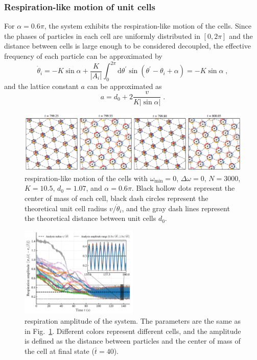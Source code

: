 \documentclass{article}
\begin{document}
\newpage
\subsubsection{Respiration-like motion of unit cells}

For $\alpha=0.6\pi$, the system exhibits the respiration-like motion of the cells. Since the phases of particles in each cell are uniformly distributed in $[0, 2\pi]$ and the distance between cells is large enough to be considered decoupled, the effective frequency of each particle can be approximated by
\begin{equation}
    \dot{\theta}_i=-K\sin \alpha +\frac{K}{\left| A_i \right|}\int_0^{2\pi}{\mathrm{d}\theta ^{\prime}\sin \left( \theta ^{\prime}-\theta _i+\alpha \right)}=-K\sin \alpha\;,
\end{equation}
and the lattice constant $a$ can be approximated as 
\begin{equation}
    a=d_0+2\frac{v}{K\left| \sin \alpha \right|}\;.
    \label{eq:latticeConstant}
\end{equation}
\begin{figure}[H]
    \centering
    \includegraphics[width=\textwidth]{./figs/respiration_snapshot.pdf}
    \caption{
        \label{fig:respiration_snapshot}
        respiration-like motion of the cells with $\omega _{\min}=0$, $\Delta \omega=0$, $N=3000$, $K=10.5$, $d_0=1.07$, and $\alpha=0.6\pi$. Black hollow dots represent the center of mass of each cell, black dash circles represent the theoretical unit cell radius $v/\dot{\theta}_i$, and the gray dash lines represent the theoretical distance between unit cells $d_0$.
    }
\end{figure}
\begin{figure}[H]
    \centering
    \includegraphics[width=0.5\textwidth]{./figs/respiration_amplitude_inset.pdf}
    \caption{
        \label{fig:respiration_amplitude}
        respiration amplitude of the system. 
        The parameters are the same as in Fig.~\ref{fig:respiration_snapshot}.
        Different colors represent different cells, and the amplitude is defined as the distance between particles and the center of mass of the cell at final state ($\bar{t}=40$).
    }
\end{figure}
\end{document}
